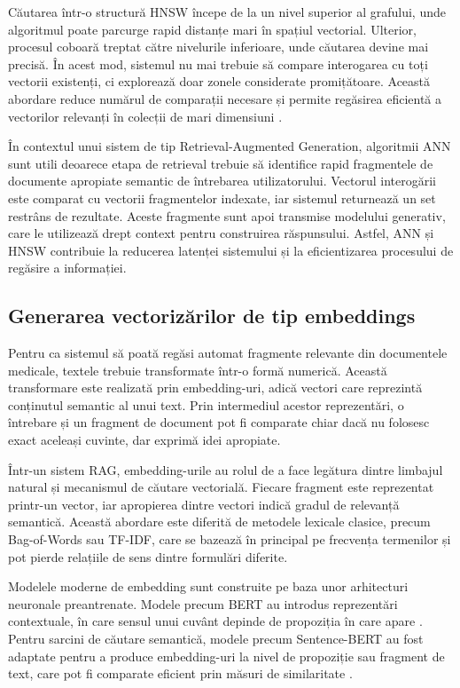 \documentclass[12pt, a4paper, oneside, romanian]{teza-upb}
\begin{document}
Căutarea într-o structură HNSW începe de la un nivel superior al grafului, unde algoritmul poate parcurge rapid distanțe mari în spațiul vectorial. Ulterior, procesul coboară treptat către nivelurile inferioare, unde căutarea devine mai precisă. În acest mod, sistemul nu mai trebuie să compare interogarea cu toți vectorii existenți, ci explorează doar zonele considerate promițătoare. Această abordare reduce numărul de comparații necesare și permite regăsirea eficientă a vectorilor relevanți în colecții de mari dimensiuni \cite{malkov2018hnsw}.

În contextul unui sistem de tip Retrieval-Augmented Generation, algoritmii ANN sunt utili deoarece etapa de retrieval trebuie să identifice rapid fragmentele de documente apropiate semantic de întrebarea utilizatorului. Vectorul interogării este comparat cu vectorii fragmentelor indexate, iar sistemul returnează un set restrâns de rezultate. Aceste fragmente sunt apoi transmise modelului generativ, care le utilizează drept context pentru construirea răspunsului. Astfel, ANN și HNSW contribuie la reducerea latenței sistemului și la eficientizarea procesului de regăsire a informației.

\subsection{Generarea vectorizărilor de tip embeddings}

Pentru ca sistemul să poată regăsi automat fragmente relevante din documentele medicale, textele trebuie transformate într-o formă numerică. Această transformare este realizată prin embedding-uri, adică vectori care reprezintă conținutul semantic al unui text. Prin intermediul acestor reprezentări, o întrebare și un fragment de document pot fi comparate chiar dacă nu folosesc exact aceleași cuvinte, dar exprimă idei apropiate.

Într-un sistem RAG, embedding-urile au rolul de a face legătura dintre limbajul natural și mecanismul de căutare vectorială. Fiecare fragment este reprezentat printr-un vector, iar apropierea dintre vectori indică gradul de relevanță semantică. Această abordare este diferită de metodele lexicale clasice, precum Bag-of-Words sau TF-IDF, care se bazează în principal pe frecvența termenilor și pot pierde relațiile de sens dintre formulări diferite.

Modelele moderne de embedding sunt construite pe baza unor arhitecturi neuronale preantrenate. Modele precum BERT au introdus reprezentări contextuale, în care sensul unui cuvânt depinde de propoziția în care apare \cite{devlin2018bert}. Pentru sarcini de căutare semantică, modele precum Sentence-BERT au fost adaptate pentru a produce embedding-uri la nivel de propoziție sau fragment de text, care pot fi comparate eficient prin măsuri de similaritate \cite{reimers2019sbert}.
\end{document}
